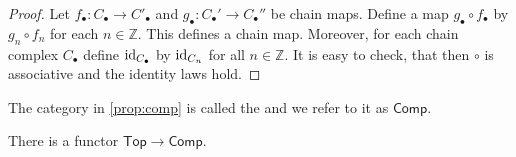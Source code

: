 \begin{proof}
	Let $f_\bullet : C_\bullet \to C'_\bullet$ and $g_\bullet : C_\bullet' \to C_\bullet''$ be chain maps. Define a map $g_\bullet \circ f_\bullet$ by $g_n \circ f_n$ for each $n \in \mathbb{Z}$. This defines a chain map. Moreover, for each chain complex $C_\bullet$ define $\operatorname{id}_{C_\bullet}$ by $\operatorname{id}_{C_n}$ for all $n \in \mathbb{Z}$. It is easy to check, that then $\circ$ is associative and the identity laws hold.
\end{proof}

\begin{definition}
	The category in \ref{prop:comp} is called the  and we refer to it as $\mathsf{Comp}$.
\end{definition}

\begin{theorem}
	There is a functor $\mathsf{Top} \to \mathsf{Comp}$.
\end{theorem}

